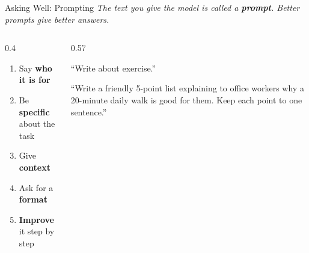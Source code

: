 \begin{frame}{Asking Well: Prompting}
    \textit{The text you give the model is called a \textbf{prompt}. Better prompts give better answers.}

    \vspace{0.6em}
    \begin{columns}[T]
        \begin{column}{0.4\textwidth}
            \begin{enumerate}
                \setlength\itemsep{0.5em}
                \item Say \textbf{who it is for}
                \item Be \textbf{specific} about the task
                \item Give \textbf{context}
                \item Ask for a \textbf{format}
                \item \textbf{Improve} it step by step
            \end{enumerate}
        \end{column}
        \begin{column}{0.57\textwidth}
            \begin{tcolorbox}[colback=red!5, colframe=red!50, title=\textbf{Vague}]
                \small ``Write about exercise.''
            \end{tcolorbox}
            \begin{tcolorbox}[colback=blue!5, colframe=blue!50, title=\textbf{Clear}]
                \small ``Write a friendly 5-point list explaining to office workers why a
                20-minute daily walk is good for them. Keep each point to one sentence.''
            \end{tcolorbox}
        \end{column}
    \end{columns}
\end{frame}
